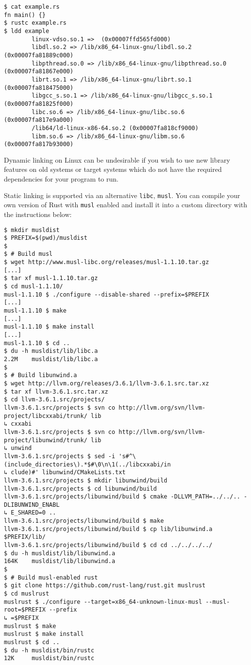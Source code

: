 \documentclass[a4paper,]{book}
\begin{document}
\begin{verbatim}
$ cat example.rs
fn main() {}
$ rustc example.rs
$ ldd example
        linux-vdso.so.1 =>  (0x00007ffd565fd000)
        libdl.so.2 => /lib/x86_64-linux-gnu/libdl.so.2 (0x00007fa81889c000)
        libpthread.so.0 => /lib/x86_64-linux-gnu/libpthread.so.0 (0x00007fa81867e000)
        librt.so.1 => /lib/x86_64-linux-gnu/librt.so.1 (0x00007fa818475000)
        libgcc_s.so.1 => /lib/x86_64-linux-gnu/libgcc_s.so.1 (0x00007fa81825f000)
        libc.so.6 => /lib/x86_64-linux-gnu/libc.so.6 (0x00007fa817e9a000)
        /lib64/ld-linux-x86-64.so.2 (0x00007fa818cf9000)
        libm.so.6 => /lib/x86_64-linux-gnu/libm.so.6 (0x00007fa817b93000)
\end{verbatim}

Dynamic linking on Linux can be undesirable if you wish to use new
library features on old systems or target systems which do not have the
required dependencies for your program to run.

Static linking is supported via an alternative \texttt{libc},
\texttt{musl}. You can compile your own version of Rust with
\texttt{musl} enabled and install it into a custom directory with the
instructions below:

\begin{verbatim}
$ mkdir musldist
$ PREFIX=$(pwd)/musldist
$
$ # Build musl
$ wget http://www.musl-libc.org/releases/musl-1.1.10.tar.gz
[...]
$ tar xf musl-1.1.10.tar.gz
$ cd musl-1.1.10/
musl-1.1.10 $ ./configure --disable-shared --prefix=$PREFIX
[...]
musl-1.1.10 $ make
[...]
musl-1.1.10 $ make install
[...]
musl-1.1.10 $ cd ..
$ du -h musldist/lib/libc.a
2.2M    musldist/lib/libc.a
$
$ # Build libunwind.a
$ wget http://llvm.org/releases/3.6.1/llvm-3.6.1.src.tar.xz
$ tar xf llvm-3.6.1.src.tar.xz
$ cd llvm-3.6.1.src/projects/
llvm-3.6.1.src/projects $ svn co http://llvm.org/svn/llvm-project/libcxxabi/trunk/ lib
↳ cxxabi
llvm-3.6.1.src/projects $ svn co http://llvm.org/svn/llvm-project/libunwind/trunk/ lib
↳ unwind
llvm-3.6.1.src/projects $ sed -i 's#^\(include_directories\).*$#\0\n\1(../libcxxabi/in
↳ clude)#' libunwind/CMakeLists.txt
llvm-3.6.1.src/projects $ mkdir libunwind/build
llvm-3.6.1.src/projects $ cd libunwind/build
llvm-3.6.1.src/projects/libunwind/build $ cmake -DLLVM_PATH=../../.. -DLIBUNWIND_ENABL
↳ E_SHARED=0 ..
llvm-3.6.1.src/projects/libunwind/build $ make
llvm-3.6.1.src/projects/libunwind/build $ cp lib/libunwind.a $PREFIX/lib/
llvm-3.6.1.src/projects/libunwind/build $ cd cd ../../../../
$ du -h musldist/lib/libunwind.a
164K    musldist/lib/libunwind.a
$
$ # Build musl-enabled rust
$ git clone https://github.com/rust-lang/rust.git muslrust
$ cd muslrust
muslrust $ ./configure --target=x86_64-unknown-linux-musl --musl-root=$PREFIX --prefix
↳ =$PREFIX
muslrust $ make
muslrust $ make install
muslrust $ cd ..
$ du -h musldist/bin/rustc
12K     musldist/bin/rustc
\end{verbatim}
\end{document}
